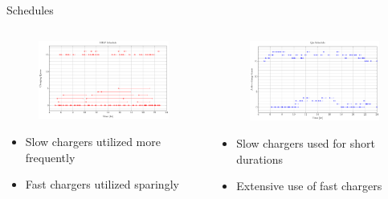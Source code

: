 \documentclass[aspectratio=169,dvipsnames]{beamer}
\begin{document}
\begin{frame}[label={sec:org229d228}]{Schedules}
\begin{columns}
\begin{column}{0.5\columnwidth}
\begin{figure}[htpb]
\centering
    \includegraphics[width=\textwidth]{img/milp-pap/schedule-milp-pap}
\end{figure}

\begin{itemize}
\item Slow chargers utilized more frequently
\item Fast chargers utilized sparingly
\end{itemize}
\end{column}

\begin{column}{0.5\columnwidth}
\begin{figure}[htpb]
\centering
    \includegraphics[width=\textwidth]{img/milp-pap/schedule-qin}
\end{figure}

\begin{itemize}
\item Slow chargers used for short durations
\item Extensive use of fast chargers
\end{itemize}
\end{column}
\end{columns}
\end{frame}
\end{document}
